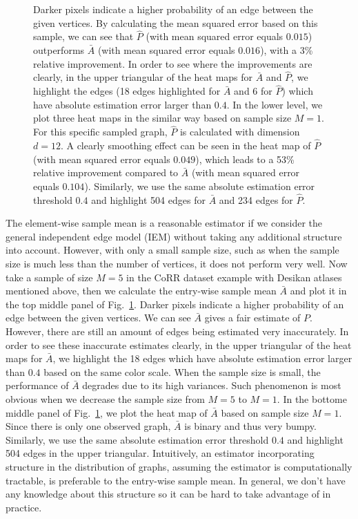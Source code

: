 \documentclass[10pt,letterpaper]{article}
\renewcommand{\hat}{\widehat}
\begin{document}
\begin{figure}[!tbp]
{Darker pixels indicate a higher probability of an edge between the given vertices.
By calculating the mean squared error based on this sample, we can see that $\hat{P}$ (with mean squared error equals $0.015$) outperforms $\bar{A}$ (with mean squared error equals $0.016$), with a 3\% relative improvement.
In order to see where the improvements are clearly, in the upper triangular of the heat maps for $\bar{A}$ and $\hat{P}$, we highlight the edges (18 edges highlighted for $\bar{A}$ and 6 for $\hat{P}$) which have absolute estimation error larger than $0.4$.
In the lower level, we plot three heat maps in the similar way based on sample size $M = 1$. For this specific sampled graph, $\hat{P}$ is calculated with dimension $d = 12$. A clearly smoothing effect can be seen in the heat map of $\hat{P}$ (with mean squared error equals $0.049$), which leads to a 53\% relative improvement compared to $\bar{A}$ (with mean squared error equals $0.104$). Similarly, we use the same absolute estimation error threshold $0.4$ and highlight 504 edges for $\bar{A}$ and 234 edges for $\hat{P}$.}
\label{fig:Matrix_desikan_m5}
\end{figure}



The element-wise sample mean is a reasonable estimator if we consider the general independent edge model (IEM) \citep{bollobas2007phase} without taking any additional structure into account. 
However, with only a small sample size, such as when the sample size is much less than the number of vertices, it does not perform very well.
Now take a sample of size $M=5$ in the CoRR dataset example with Desikan atlases mentioned above, then we calculate the entry-wise sample mean $\bar{A}$ and plot it in the top middle panel of Fig.~\ref{fig:Matrix_desikan_m5}. Darker pixels indicate a higher probability of an edge between the given vertices.
We can see $\bar{A}$ gives a fair estimate of $P$. However, there are still an amount of edges being estimated very inaccurately. In order to see these inaccurate estimates clearly, in the upper triangular of the heat maps for $\bar{A}$, we highlight the 18 edges which have absolute estimation error larger than $0.4$ based on the same color scale.
When the sample size is small, the performance of $\bar{A}$ degrades due to its high variances. Such phenomenon is most obvious when we decrease the sample size from $M = 5$ to $M = 1$.
In the bottome middle panel of Fig.~\ref{fig:Matrix_desikan_m5}, we plot the heat map of $\bar{A}$ based on sample size $M = 1$. Since there is only one observed graph, $\bar{A}$ is binary and thus very bumpy. Similarly, we use the same absolute estimation error threshold $0.4$ and highlight 504 edges in the upper triangular.
Intuitively, an estimator incorporating structure in the distribution of graphs, assuming the estimator is computationally tractable, is preferable to the entry-wise sample mean. 
In general, we don't have any knowledge about this structure so it can be hard to take advantage of in practice.
\end{document}
